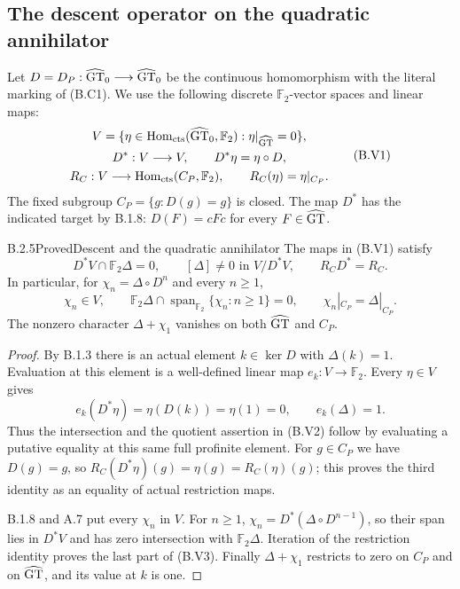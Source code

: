 \subsection{The descent operator on the quadratic annihilator}

Let $D=D_P:\widehat{\mathrm{GT}}_0\longrightarrow\widehat{\mathrm{GT}}_0$ be the continuous
homomorphism with the literal marking of (B.C1).  We use the
following discrete $\mathbb F_2$-vector spaces and linear maps:
\[
\begin{gathered}
 V=\{\eta\in\operatorname{Hom}_{\rm cts}(\widehat{\mathrm{GT}}_0,\mathbb F_2):
                         \eta|_{\widehat{\mathrm{GT}}}=0\},\\
 D^*:V\longrightarrow V,\qquad D^*\eta=\eta\circ D,\\
 R_C:V\longrightarrow
       \operatorname{Hom}_{\rm cts}(C_P,\mathbb F_2),
       \qquad R_C(\eta)=\eta|_{C_P}.
\end{gathered}                                                   \tag{B.V1}
\]
The fixed subgroup $C_P=\{g:D(g)=g\}$ is closed.  The map $D^*$
has the indicated target by B.1.8: $D(F)=cFc$ for every $F\in\widehat{\mathrm{GT}}$.

\begin{result}{B.2.5}{Proved}{Descent and the quadratic annihilator}
The maps in (B.V1) satisfy
\[
 D^*V\cap\mathbb F_2\Delta=0,\qquad
 [\Delta]\ne0\text{ in }V/D^*V,\qquad R_C D^*=R_C.       \tag{B.V2}
\]
In particular, for $\chi_n=\Delta\circ D^n$ and every $n\geq1$,
\[
 \chi_n\in V,\qquad
 \mathbb F_2\Delta\cap
       \operatorname{span}_{\mathbb F_2}\{\chi_n:n\geq1\}=0,
 \qquad \chi_n|_{C_P}=\Delta|_{C_P}.                      \tag{B.V3}
\]
The nonzero character $\Delta+\chi_1$ vanishes on both $\widehat{\mathrm{GT}}$
and $C_P$.
\end{result}
\begin{proof}
By B.1.3 there is an actual element $k\in\ker D$ with
$\Delta(k)=1$.  Evaluation at this element is a well-defined
linear map $e_k:V\to\mathbb F_2$.  Every $\eta\in V$ gives
\[
                   e_k(D^*\eta)=\eta(D(k))=\eta(1)=0,
                   \qquad e_k(\Delta)=1.                \tag{B.V4}
\]
Thus the intersection and the quotient assertion in (B.V2)
follow by evaluating a putative equality at this same full
profinite element.  For $g\in C_P$ we have $D(g)=g$, so
$R_C(D^*\eta)(g)=\eta(g)=R_C(\eta)(g)$; this proves the third
identity as an equality of actual restriction maps.

B.1.8 and A.7 put every $\chi_n$ in $V$.  For $n\geq1$,
$\chi_n=D^*(\Delta\circ D^{n-1})$, so their span lies in
$D^*V$ and has zero intersection with $\mathbb F_2\Delta$.
Iteration of the restriction identity proves the last part
of (B.V3).  Finally $\Delta+\chi_1$ restricts to zero on
$C_P$ and on $\widehat{\mathrm{GT}}$, and its value at $k$ is one.
\end{proof}

